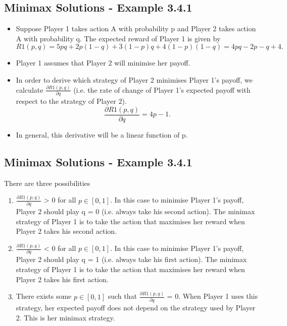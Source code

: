 \documentclass[]{report}
\begin{document}
	\subsection{Minimax Solutions - Example 3.4.1}
	\begin{itemize}
		\item Suppose Player 1 takes action A with probability p and Player 2
		takes action A with probability q. The expected reward of Player 1
		is given by
		\[R1(p, q) = 5pq+2p(1−q)+3(1−p)q+4(1−p)(1−q) = 4pq−2p−q+4.\]
		\item Player 1 assumes that Player 2 will minimise her payoff. 
		\item In order to
		derive which strategy of Player 2 minimises Player 1’s payoff, we
		calculate $\frac{\partial R1(p, q)}{\partial q}$
		(i.e. the rate of change of Player 1’s expected
		payoff with respect to the strategy of Player 2).
		\[\frac{\partial R1(p, q)}{\partial q} = 4p − 1.\]
		\item	In general, this derivative will be a linear function of p.
	\end{itemize}
	
	\subsection{Minimax Solutions - Example 3.4.1}
	There are three possibilities
	\begin{enumerate}
		\item  $\frac{\partial R1(p,q)}{\partial q}$ > 0 for all $p \in [0, 1]$. In this case to minimise
		Player 1’s payoff, Player 2 should play q = 0 (i.e.
		always take his second action). The minimax strategy
		of Player 1 is to take the action that maximises her
		reward when Player 2 takes his second action.
		\item  $\frac{\partial R1(p,q)}{\partial q}$ < 0 for all $p \in [0, 1]$. In this case to minimise
		Player 1’s payoff, Player 2 should play q = 1 (i.e.
		always take his first action). The minimax strategy of
		Player 1 is to take the action that maximises her
		reward when Player 2 takes his first action.
		\item There exists some $p \in [0, 1]$ such that $\frac{\partial R1(p,q)}{\partial q}$ = 0.
		When Player 1 uses this strategy, her expected payoff
		does not depend on the strategy used by Player 2.
		This is her minimax strategy.
	\end{enumerate}
	
\end{document}
